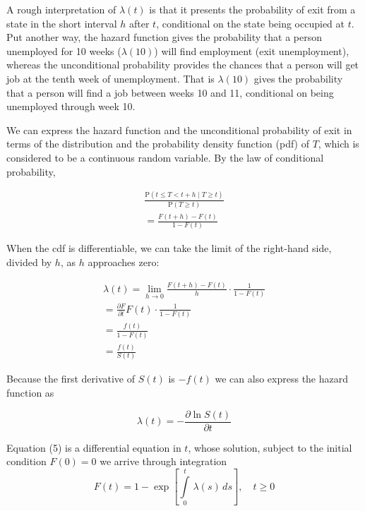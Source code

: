 \documentclass[
  11pt,
]{article}
\begin{document}
A rough interpretation of \(\lambda(t)\) is that it presents the
probability of exit from a state in the short interval \(h\) after
\(t\), conditional on the state being occupied at \(t\). Put another
way, the hazard function gives the probability that a person unemployed
for 10 weeks (\(\lambda(10)\)) will find employment (exit unemployment),
whereas the unconditional probability provides the chances that a person
will get job at the tenth week of unemployment. That is \(\lambda(10)\)
gives the probability that a person will find a job between weeks 10 and
11, conditional on being unemployed through week 10.

We can express the hazard function and the unconditional probability of
exit in terms of the distribution and the probability density function
(pdf) of \(T\), which is considered to be a continuous random variable.
By the law of conditional probability,

\begin{equation}
\begin{gathered}
\frac{\mathrm{P}(t \leq T < t + h \; | \; T \geq t)}{\mathrm{P}(T \geq t)} \\[8pt]
= \frac{F(t + h) - F(t)}{1 - F(t)}
\end{gathered}
\end{equation}

When the cdf is differentiable, we can take the limit of the right-hand
side, divided by \(h\), as \(h\) approaches zero:

\begin{equation}
\begin{gathered}
\lambda(t) = \lim_{h \to 0} \frac{F(t + h) - F(t)}{h}\cdot \frac{1}{1 - F(t)} \\[8pt]
= \frac{\partial F}{\partial t}F(t) \cdot \frac{1}{1 - F(t)} \\[8pt]
= \frac{f(t)}{1 - F(t)} \\[8pt]
= \frac{f(t)}{S(t)}
\end{gathered}
\end{equation}

Because the first derivative of \(S(t)\) is \(-f(t)\) we can also
express the hazard function as

\begin{equation}
\lambda(t) = - \frac{\partial \ln S(t)}{\partial t}
\end{equation}

Equation (5) is a differential equation in \(t\), whose solution,
subject to the initial condition \(F(0) = 0\) we arrive through
integration \begin{equation}
F(t) = 1 - \exp\left[\int\limits_{0}^{t}\,\lambda(s)\,ds \right], \quad t \geq 0
\end{equation}
\end{document}
